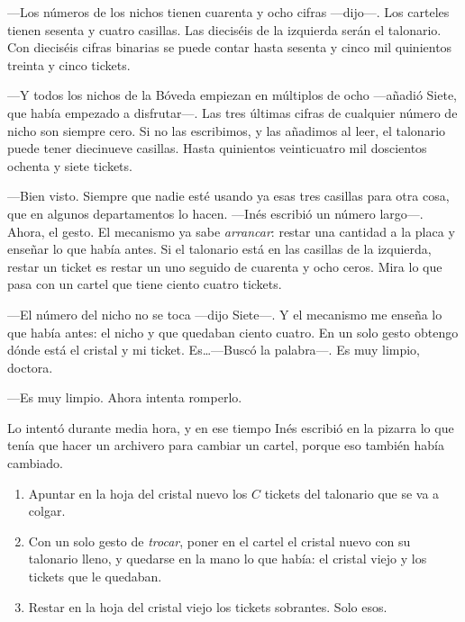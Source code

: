 ---Los números de los nichos tienen cuarenta y ocho cifras ---dijo---\nobreak. Los carteles tienen sesenta y cuatro casillas. Las dieciséis de la izquierda serán el talonario. Con dieciséis cifras binarias se puede contar hasta sesenta y cinco mil quinientos treinta y cinco tickets.

---Y todos los nichos de la Bóveda empiezan en múltiplos de ocho ---añadió Siete, que había empezado a disfrutar---\nobreak. Las tres últimas cifras de cualquier número de nicho son siempre cero. Si no las escribimos, y las añadimos al leer, el talonario puede tener diecinueve casillas. Hasta quinientos veinticuatro mil doscientos ochenta y siete tickets.

---Bien visto. Siempre que nadie esté usando ya esas tres casillas para otra cosa, que en algunos departamentos lo hacen. ---Inés escribió un número largo---\nobreak. Ahora, el gesto. El mecanismo ya sabe \emph{arrancar}: restar una cantidad a la placa y enseñar lo que había antes. Si el talonario está en las casillas de la izquierda, restar un ticket es restar un uno seguido de cuarenta y ocho ceros. Mira lo que pasa con un cartel que tiene ciento cuatro tickets.

\begin{pizarra}
\end{pizarra}

---El número del nicho no se toca ---dijo Siete---\nobreak. Y el mecanismo me enseña lo que había antes: el nicho y que quedaban ciento cuatro. En un solo gesto obtengo dónde está el cristal y mi ticket. Es\ldots ---Buscó la palabra---\nobreak. Es muy limpio, doctora.

---Es muy limpio. Ahora intenta romperlo.

\escena
Lo intentó durante media hora, y en ese tiempo Inés escribió en la pizarra lo que tenía que hacer un archivero para cambiar un cartel, porque eso también había cambiado.

\begin{documento}
\begin{enumerate}
\item Apuntar en la hoja del cristal nuevo los $C$ tickets del talonario que se va a colgar.
\item Con un solo gesto de \emph{trocar}, poner en el cartel el cristal nuevo con su talonario lleno, y quedarse en la mano lo que había: el cristal viejo y los tickets que le quedaban.
\item Restar en la hoja del cristal viejo los tickets sobrantes. Solo esos.
\end{enumerate}
\end{documento}

